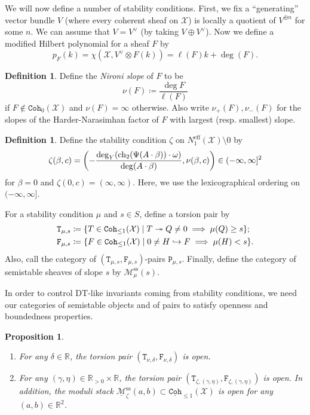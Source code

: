 \documentclass{amsart}
\newtheorem{prop}[thm]{Proposition}
\theoremstyle{definition}
\newtheorem{defn}[thm]{Definition}
\theoremstyle{remark}
\theoremstyle{plain}
\theoremstyle{definition}
\theoremstyle{remark}
\newcommand{\R}{\mathbb{R}}
\newcommand{\mc}[1]{\mathcal{#1}}
\newcommand{\mr}[1]{\mathrm{#1}}
\newcommand{\on}[1]{\operatorname{#1}}
\newcommand{\mt}[1]{\mathtt{#1}}
\newcommand{\ul}[1]{\underline{#1}}
\newcommand{\1}{\mathbf{1}}
\newcommand{\2}{\mathbf{2}}
\newcommand{\3}{\mathbf{3}}
\begin{document}
We will now define a number of stability conditions. First, we fix a ``generating'' vector bundle $V$ (where every coherent sheaf on $\mc{X}$) is locally a quotient of $V^{\oplus n}$ for some $n$. We can assume that $V = V^{\vee}$ (by taking $V \oplus V^{\vee}$). Now we define a modified Hilbert polynomial for a sheaf $F$ by
\[ p_F(k) = \chi(\mc{X}, V^{\vee} \otimes F(k)) = \ell(F) k + \deg(F). \]

\begin{defn}
    Define the \textit{Nironi slope} of $F$ to be
    \[ \nu(F) \coloneqq \frac{\deg F}{\ell(F)} \]
    if $F \notin \mt{Coh}_0(\mc{X})$ and $\nu(F) = \infty$ otherwise. Also write $\nu_+(F), \nu_-(F)$ for the slopes of the Harder-Narasimhan factor of $F$ with largest (resp. smallest) slope.
\end{defn}

\begin{defn}
    Define the stability condition $\zeta$ on $N_1^{\mr{eff}}(\mc{X}) \setminus 0$ by
    \[ \zeta(\beta, c) = \qty(- \frac{\deg_Y(\on{ch_2}(\Psi(A \cdot \beta)) \cdot \omega)}{\deg(A \cdot \beta)}, \nu(\beta, c)) \in (-\infty, \infty]^2 \]
    for $\beta = 0$ and $\zeta(0, c) = (\infty, \infty)$. Here, we use the lexicographical ordering on $(-\infty, \infty]$.
\end{defn}

For a stability condition $\mu$ and $s \in S$, define a torsion pair by 
\begin{align*}
    \mt{T}_{\mu, s} &\coloneqq \qty{T \in \mt{Coh}_{\leq 1}(\mc{X}) \mid T \twoheadrightarrow Q \neq 0 \implies \mu(Q) \geq s}; \\
    \mt{F}_{\mu, s} &\coloneqq \qty{F \in \mt{Coh}_{\leq 1}(\mc{X}) \mid 0 \neq H \hookrightarrow F \implies \mu(H) < s}.
\end{align*}
Also, call the category of $(\mt{T}_{\mu, s}, \mt{F}_{\mu, s})$-pairs $\mt{P}_{\mu, s}$. Finally, define the category of semistable sheaves of slope $s$ by $\mc{M}_{\mu}^{\mr{ss}}(s)$.

In order to control DT-like invariants coming from stability conditions, we need our categories of semistable objects and of pairs to satisfy openness and boundedness properties. 

\begin{prop}\leavevmode
    \begin{enumerate}
        \item For any $\delta \in \R$, the torsion pair $(\mt{T}_{\nu,\delta}, \mt{F}_{\nu, \delta})$ is open.
        \item For any $(\gamma, \eta) \in \R_{>0} \times \R$, the torsion pair $(\mt{T}_{\zeta, (\gamma,\eta)}, \mt{F}_{\zeta, (\gamma,\eta)})$ is open. In addition, the moduli stack $\ul{\mc{M}}_{\zeta}^{\mr{ss}}(a,b) \subset \mt{\ul{Coh}}_{\leq 1}(\mc{X})$ is open for any $(a,b) \in \R^2$.
    \end{enumerate}
\end{prop}
\end{document}
